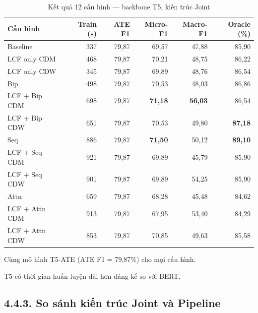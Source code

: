 \begin{table}[H]
\centering
\small
\caption{Kết quả 12 cấu hình — backbone T5, kiến trúc Joint}
\label{tab:t5_results}
\begin{threeparttable}
\begin{tabular}{@{}lrrrrr@{}}
\toprule
\textbf{Cấu hình} & \textbf{Train (s)} & \textbf{ATE F1} & \textbf{Micro-F1} & \textbf{Macro-F1} & \textbf{Oracle (\%)} \\
\midrule
Baseline               & 337 & 79,87 & 69,57 & 47,88 & 85,90 \\
\midrule
LCF only CDM           & 468 & 79,87 & 70,21 & 48,75 & 86,22 \\
LCF only CDW           & 345 & 79,87 & 69,89 & 48,76 & 86,54 \\
\midrule
Bip                    & 498 & 79,87 & 70,53 & 48,03 & 86,86 \\
LCF + Bip CDM          & 698 & 79,87 & \textbf{71,18} & \textbf{56,03} & 86,54 \\
LCF + Bip CDW          & 651 & 79,87 & 70,53 & 49,80 & \textbf{87,18} \\
\midrule
Seq                    & 886 & 79,87 & \textbf{71,50} & 50,12 & \textbf{89,10} \\
LCF + Seq CDM          & 921 & 79,87 & 69,89 & 45,79 & 85,90 \\
LCF + Seq CDW          & 901 & 79,87 & 69,89 & 54,25 & 85,90 \\
\midrule
Attn                   & 659 & 79,87 & 68,28 & 45,48 & 84,62 \\
LCF + Attn CDM         & 913 & 79,87 & 67,95 & 53,40 & 84,29 \\
LCF + Attn CDW         & 853 & 79,87 & 70,85 & 49,63 & 85,58 \\
\bottomrule
\end{tabular}
\begin{tablenotes}
  \small
  \item Cùng mô hình T5-ATE (ATE F1 = 79,87\%) cho mọi cấu hình.
  \item T5 có thời gian huấn luyện dài hơn đáng kể so với BERT.
\end{tablenotes}
\end{threeparttable}
\end{table}

\subsection{4.4.3.\; So sánh kiến trúc Joint và Pipeline}
\label{subsec:joint_vs_pipeline}

